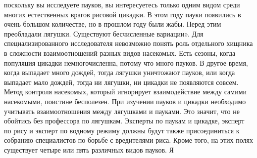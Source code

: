 \documentclass[a4paper]{book}
\begin{document}
поскольку вы исследуете пауков, вы интересуетесь только одним видом среди многих
естественных врагов рисовой цикадки. В этом году пауки появились в очень большом
количестве, но в прошлом году были жабы. Перед этим преобладали лягушки. Существуют
бесчисленные вариации».
Для специализированного исследователя невозможно понять роль отдельного хищника в
сложности взаимоотношений разных видов насекомых. Есть сезоны, когда популяция
цикадки немногочисленна, потому что много пауков. В другое время, когда выпадает много
дождей, тогда лягушки уничтожают пауков, или когда выпадает мало дождей, тогда ни
лягушки, ни цикадки не появляются совсем.
Метод контроля насекомых, который игнорирует взаимодействие между самими
насекомыми, поистине бесполезен. При изучении пауков и цикадки необходимо учитывать
взаимоотношения между лягушками и пауками. Это значит, что не обойтись без профессора
по лягушкам. Эксперты по паукам и цикадке, эксперт по рису и эксперт по водному режиму
должны будут также присоединиться к собранию специалистов по борьбе с вредителями
риса.
Кроме того, на этих полях существует четыре или пять различных видов пауков. Я
\end{document}
